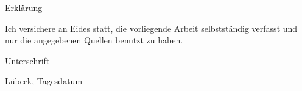 \Large
Erklärung
\newline
\vspace{3\baselineskip}
\normalsize
\noindent

Ich versichere an Eides statt, die vorliegende Arbeit selbstständig verfasst und nur die angegebenen Quellen benutzt zu haben.


\vspace{5\baselineskip}


Unterschrift 

Lübeck, Tagesdatum
